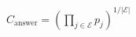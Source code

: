 \documentclass[border=3pt,varwidth=16cm]{standalone}
\begin{document}
$\displaystyle C_{\mathrm{answer}} = \left(\prod_{j \in \mathcal{E}} p_j\right)^{1/|\mathcal{E}|}$
\end{document}
